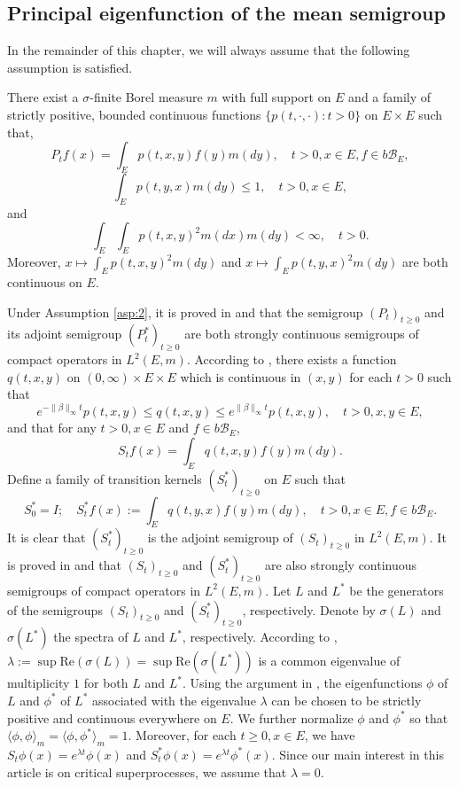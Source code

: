 \subsection{Principal eigenfunction of the mean semigroup}
	In the remainder of this chapter, we will always assume that the following assumption is satisfied.
\begin{asp}{2}\label{asp:2}
	There exist a $\sigma$-finite Borel measure $m$ with full support on $E$ and a family of strictly positive, bounded continuous functions $\{ p(t,\cdot,\cdot): t > 0 \}$ on $E \times E$ such that,
\begin{equation}\label{eq:kernMeanSemGroup}
	P_t f(x)
	= \int_E p(t,x,y) f(y) m(dy),
	\quad t>0, x \in E,f \in b\mathscr B_E,
\end{equation}
\[
	\int_E p(t,y,x)m(dy)
	\leq 1,
	\quad t>0,x\in E,
\]
	and
\[
	\int_E \int_E p(t,x,y)^2 m(dx) m(dy)
	<\infty,
	\quad t> 0.
\]
	Moreover, $x \mapsto \int_E p(t,x,y)^2 m(dy)$ and $x \mapsto \int_E p(t,y,x)^2 m(dy)$ are both continuous on $E$.
\end{asp}
	Under Assumption \ref{asp:2}, it is proved in \cite{RenSongZhang2015Limit} and \cite{RenSongZhang2017Central} that the semigroup $(P_t)_{t \geq 0}$ and its adjoint semigroup $(P^*_t)_{t \geq 0}$ are both strongly continuous semigroups of compact operators in $L^2(E,m)$.
	According to \cite[Lemma 2.1]{RenSongZhang2015Limit}, there exists a function $q(t,x,y)$ on $(0,\infty) \times E \times E$ which is continuous in $(x,y)$ for each $t>0$ such that
\[
	e^{-\|\beta\|_\infty t} p(t,x,y)
	\leq q(t,x,y)
	\leq e^{\|\beta\|_\infty t} p(t,x,y),
	\quad t>0, x, y\in E,
\]
	and that for any $t>0, x\in E$ and $f \in b\mathscr B_E$,
\[
	S_t f(x)
	= \int_E q(t,x,y) f(y) m(dy).
\]
	Define a family of transition kernels $(S^*_t)_{t \geq 0}$ on $E$ such that
\[
	S^*_0 = I;
	\quad S^*_t f(x)
	:= \int_E q(t,y,x) f(y) m(dy),
	\quad t>0, x\in E, f\in b\mathscr B_E.
\]
	It is clear that $(S^*_t)_{t \geq 0}$ is the adjoint semigroup of $(S_t)_{t \geq 0}$ in $L^2(E,m)$.
	It is proved in \cite{RenSongZhang2015Limit} and \cite{RenSongZhang2017Central} that $(S_t)_{t \geq 0}$ and $(S^*_t)_{t \geq 0}$ are also strongly continuous semigroups of compact operators in $L^2(E,m)$.
	Let $L$ and $L^*$ be the generators of the semigroups $(S_t)_{t \geq 0}$ and $(S^*_t)_{t \geq 0}$, respectively.
	Denote by $\sigma(L)$ and $\sigma(L^*)$ the spectra of $L$ and $L^*$, respectively.
	According to \cite[Theorem V.6.6.]{Schaefer1974Banach}, $\lambda := \sup \text{Re}(\sigma(L)) = \sup \text{Re}(\sigma(L^*))$ is a common eigenvalue of multiplicity $1$ for both $L$ and $L^*$.
	Using the argument in \cite{RenSongZhang2015Limit}, the eigenfunctions $\phi$ of $L$ and $\phi^*$ of $L^*$ associated with the eigenvalue $\lambda$ can be chosen to be strictly positive and continuous everywhere on $E$.
	We further normalize $\phi$ and $\phi^*$ so that $\langle\phi, \phi\rangle_m = \langle\phi,\phi^*\rangle_m = 1$.
	Moreover, for each $t\geq 0,x\in E$, we have $S_t \phi(x) = e^{\lambda t} \phi(x)$ and $S^*_t \phi(x) = e^{\lambda t} \phi^*(x)$.
	Since our main interest in this article is on critical superprocesses, we assume that $\lambda = 0$.

